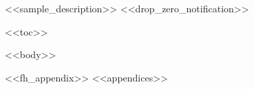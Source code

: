 \documentclass{article}
\begin{document}
\setlength{\LTleft}{0pt}
\setlength{\LTright}{\fill}
\setlength{\LTcapwidth}{\textwidth}
\vspace{.25in}

<<sample_description>>
<<drop_zero_notification>>

\renewcommand{\listtablename}{Table of Contents}
<<toc>>

<<body>>

\clearpage

<<fh_appendix>>
<<appendices>>
\end{document}
